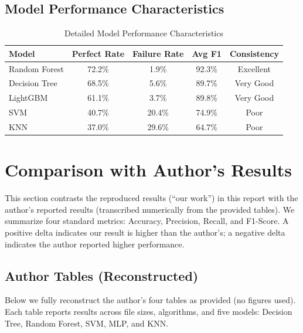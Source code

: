 \documentclass[12pt]{article}
\begin{document}
\subsection{Model Performance Characteristics}

\begin{table}[h!]
\centering
\caption{Detailed Model Performance Characteristics}
\label{tab:model_characteristics}
\begin{tabular}{|l|c|c|c|c|}
\hline
\textbf{Model} & \textbf{Perfect Rate} & \textbf{Failure Rate} & \textbf{Avg F1} & \textbf{Consistency} \\
\hline
Random Forest & 72.2\% & 1.9\% & 92.3\% & Excellent \\
\hline
Decision Tree & 68.5\% & 5.6\% & 89.7\% & Very Good \\
\hline
LightGBM & 61.1\% & 3.7\% & 89.8\% & Very Good \\
\hline
SVM & 40.7\% & 20.4\% & 74.9\% & Poor \\
\hline
KNN & 37.0\% & 29.6\% & 64.7\% & Poor \\
\hline
\end{tabular}
\end{table}

\section{Comparison with Author's Results}

This section contrasts the reproduced results (``our work'') in this report with the author's reported results (transcribed numerically from the provided tables). We summarize four standard metrics: Accuracy, Precision, Recall, and F1-Score. A positive delta indicates our result is higher than the author's; a negative delta indicates the author reported higher performance.

\subsection{Author Tables (Reconstructed)}

Below we fully reconstruct the author's four tables as provided (no figures used). Each table reports results across file sizes, algorithms, and five models: Decision Tree, Random Forest, SVM, MLP, and KNN.
\end{document}
